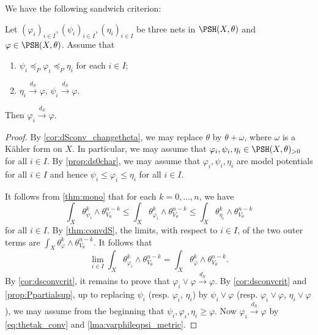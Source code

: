 We have the following sandwich criterion:
\begin{corollary}\label{cor:dsconvupplower}
    Let $(\varphi_i)_{i\in I}, (\psi_i)_{i\in I}, (\eta_i)_{i\in I}$ be three nets in $\PSH(X,\theta)$ and $\varphi\in \PSH(X,\theta)$. Assume that
    \begin{enumerate}
        \item\label{itm:cor:dsconvupplower:1} $\psi_i\preceq_P \varphi_i\preceq_P \eta_i$ for each $i\in I$;
        \item\label{itm:cor:dsconvupplower:2} $\eta_i\xrightarrow{d_S} \varphi$, $\psi_i\xrightarrow{d_S} \varphi$.
    \end{enumerate}
    Then $\varphi_i\xrightarrow{d_S}\varphi$.
\end{corollary}
\begin{proof}
    By \cref{cor:dSconv_changetheta}, we may replace $\theta$ by $\theta+\omega$, where $\omega$ is a Kähler form on $X$. In particular, we may assume that $\varphi_i,\psi_i,\eta_i\in \PSH(X,\theta)_{>0}$ for all $i\in I$.
    By \cref{prop:ds0char}, we may assume that $\varphi_i,\psi_i,\eta_i$ are model potentials for all $i\in I$ and hence $\psi_i \leq \varphi_i\leq \eta_i$ for all $i\in I$.

    It follows from \cref{thm:mono} that for each $k=0,\ldots,n$, we have
    \[
    \int_X \theta_{\psi_i}^k\wedge \theta_{V_{\theta}}^{n-k}\leq \int_X \theta_{\varphi_i}^k\wedge \theta_{V_{\theta}}^{n-k}\leq \int_X \theta_{\eta_i}^k\wedge \theta_{V_{\theta}}^{n-k}
    \]
    for all $i\in I$. By \cref{thm:convdS}, the limits, with respect to $i\in I$, of the two outer terms are $\int_X \theta_{\varphi}^k\wedge \theta_{V_{\theta}}^{n-k}$. It follows that
    \begin{equation}\label{eq:thetak_conv}
    \lim_{i\in I}\int_X \theta_{\varphi_i}^k\wedge \theta_{V_{\theta}}^{n-k}=\int_X \theta_{\varphi}^k\wedge \theta_{V_{\theta}}^{n-k}.
    \end{equation}
    By \cref{cor:dsconvcrit}, it remains to prove that $\varphi_i \lor \varphi \xrightarrow{d_S}\varphi$. By \cref{cor:dsconvcrit} and \cref{prop:Ppartialsup}, up to replacing $\psi_i$ (resp. $\varphi_i$, $\eta_i$) by $\psi_i\lor \varphi$ (resp. $\varphi_i\lor\varphi$, $\eta_i\lor\varphi$), we may assume from the beginning that $\psi_i,\varphi_i,\eta_i\geq \varphi$. Now $\varphi_i\xrightarrow{d_S}\varphi$ by \eqref{eq:thetak_conv} and \cref{lma:varphileqpsi_metric}.
\end{proof}

